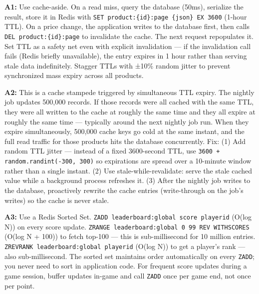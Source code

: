 \documentclass[11pt,a4paper]{article}
\begin{document}
\newpage
\begin{answerbox}
\textbf{A1:} Use cache-aside. On a read miss, query the database (50ms), serialize the result, store it in Redis with \texttt{SET product:\{id\}:page \{json\} EX 3600} (1-hour TTL). On a price change, the application writes to the database first, then calls \texttt{DEL product:\{id\}:page} to invalidate the cache. The next request repopulates it. Set TTL as a safety net even with explicit invalidation --- if the invalidation call fails (Redis briefly unavailable), the entry expires in 1 hour rather than serving stale data indefinitely. Stagger TTLs with ±10\% random jitter to prevent synchronized mass expiry across all products.

\vspace{8pt}

\textbf{A2:} This is a cache stampede triggered by simultaneous TTL expiry. The nightly job updates 500,000 records. If those records were all cached with the same TTL, they were all written to the cache at roughly the same time and they all expire at roughly the same time --- typically around the next nightly job run. When they expire simultaneously, 500,000 cache keys go cold at the same instant, and the full read traffic for those products hits the database concurrently. Fix: (1) Add random TTL jitter --- instead of a fixed 3600-second TTL, use \texttt{3600 + random.randint(-300, 300)} so expirations are spread over a 10-minute window rather than a single instant. (2) Use stale-while-revalidate: serve the stale cached value while a background process refreshes it. (3) After the nightly job writes to the database, proactively rewrite the cache entries (write-through on the job's writes) so the cache is never stale.

\vspace{8pt}

\textbf{A3:} Use a Redis Sorted Set. \texttt{ZADD leaderboard:global score playerid} (O(log N)) on every score update. \texttt{ZRANGE leaderboard:global 0 99 REV WITHSCORES} (O(log N + 100)) to fetch top-100 --- this is sub-millisecond for 10 million entries. \texttt{ZREVRANK leaderboard:global playerid} (O(log N)) to get a player's rank --- also sub-millisecond. The sorted set maintains order automatically on every \texttt{ZADD}; you never need to sort in application code. For frequent score updates during a game session, buffer updates in-game and call \texttt{ZADD} once per game end, not once per point.

\vspace{8pt}


\end{answerbox}
\end{document}

